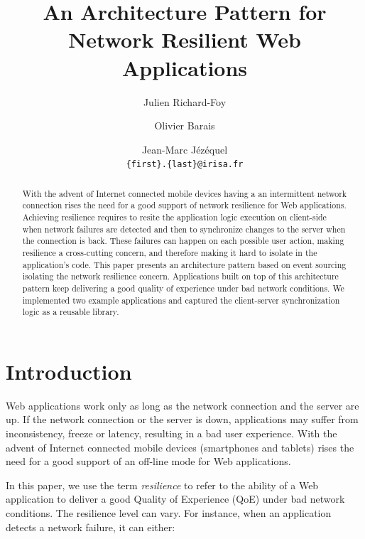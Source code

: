 \documentclass{llncs}
\begin{document}
\title{An Architecture Pattern for Network Resilient Web Applications}

\author{Julien Richard-Foy\and Olivier Barais \and Jean-Marc J\'ez\'equel\\{\tt \{first\}.\{last\}@irisa.fr}}


\maketitle

\begin{abstract}
With the advent of Internet connected mobile devices having a an intermittent network connection rises the need for a good support of network resilience for Web applications. Achieving resilience requires to resite the application logic execution on client-side when network failures are detected and then to synchronize changes to the server when the connection is back. These failures can happen on each possible user action, making resilience a cross-cutting concern, and therefore making it hard to isolate in the application's code. This paper presents an architecture pattern based on event sourcing isolating the network resilience concern. Applications built on top of this architecture pattern keep delivering a good quality of experience under bad network conditions. We implemented two example applications and captured the client-server synchronization logic as a reusable library.
\end{abstract}

\section{Introduction}

Web applications work only as long as the network connection and the server are up. If the network connection or the server is down, applications may suffer from inconsistency, freeze or latency, resulting in a bad user experience. With the advent of Internet connected mobile devices (smartphones and tablets) rises the need for a good support of an off-line mode for Web applications.

In this paper, we use the term \textit{resilience} to refer to the ability of a Web application to deliver a good Quality of Experience (QoE) under bad network conditions. The resilience level can vary. For instance, when an application detects a network failure, it can either:
\end{document}
